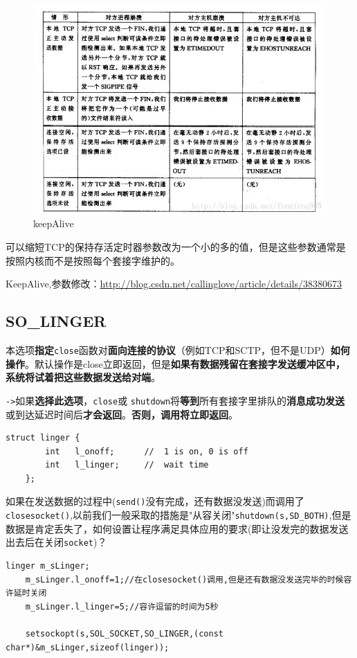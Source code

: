 \documentclass[UTF8,a4paper,12pt]{ctexbook}
\begin{document}
			\begin{figure}[h]
				\centering
				\includegraphics[scale = 0.9]{figures/keepAlive.jpg}
				\caption{keepAlive}
			\end{figure}
			
			可以缩短TCP的保持存活定时器参数改为一个小的多的值，但是这些参数通常是按照内核而不是按照每个套接字维护的。
			
			KeepAlive,参数修改：\url{http://blog.csdn.net/callinglove/article/details/38380673}
			
			
		\subsection{SO\_LINGER}本选项\textbf{指定}\verb|close|函数对\textbf{面向连接的协议}（例如TCP和SCTP，但不是UDP）\textbf{如何操作}。默认操作是close立即返回，但是\textbf{如果有数据残留在套接字发送缓冲区中，系统将试着把这些数据发送给对端}。
			
			\verb|->|如果\textbf{选择此选项}，\verb|close|或 \verb|shutdown|将\textbf{等到}所有套接字里排队的\textbf{消息成功发送}或到达延迟时间后\textbf{才会返回}。\textbf{否则，调用将立即返回}。
			
			\begin{lstlisting}[frame=L]
	struct linger {  
		int   l_onoff;      //  1 is on, 0 is off
		int   l_linger;     //  wait time
	};  
			\end{lstlisting}
			
			如果在发送数据的过程中(\verb|send()|没有完成，还有数据没发送)而调用了\verb|closesocket()|,以前我们一般采取的措施是"从容关闭"\verb|shutdown(s,SD_BOTH)|,但是数据是肯定丢失了，如何设置让程序满足具体应用的要求(即让没发完的数据发送出去后在关闭\verb|socket|)？
			\begin{lstlisting}[frame=L]	
	linger m_sLinger;
	m_sLinger.l_onoff=1;//在closesocket()调用,但是还有数据没发送完毕的时候容许延时关闭
	m_sLinger.l_linger=5;//容许逗留的时间为5秒
	
	setsockopt(s,SOL_SOCKET,SO_LINGER,(const char*)&m_sLinger,sizeof(linger));
			\end{lstlisting}
			
\end{document}
